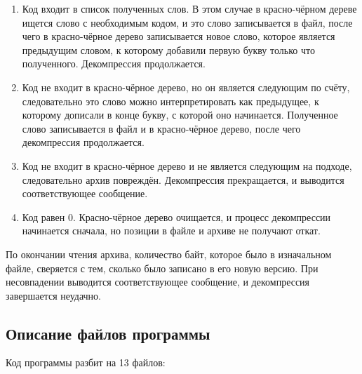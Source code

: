 \documentclass[12pt]{article}
\begin{document}
\begin{enumerate}
	\item Код входит в список полученных слов. В этом случае в красно-чёрном дереве ищется слово с необходимым кодом, и это слово записывается в файл, после чего в красно-чёрное дерево записывается новое слово, которое является предыдущим словом, к которому добавили первую букву только что полученного. Декомпрессия продолжается.
	\item Код не входит в красно-чёрное дерево, но он является следующим по счёту, следовательно это слово можно интерпретировать как предыдущее, к которому дописали в конце букву, с которой оно начинается. Полученное слово записывается в файл и в красно-чёрное дерево, после чего декомпрессия продолжается.
	\item Код не входит в красно-чёрное дерево и не является следующим на подходе, следовательно архив повреждён. Декомпрессия прекращается, и выводится соответствующее сообщение.
	\item Код равен $0$. Красно-чёрное дерево очищается, и процесс декомпрессии начинается сначала, но позиции в файле и архиве не получают откат.
\end{enumerate}

По окончании чтения архива, количество байт, которое было в изначальном файле, сверяется с тем, сколько было записано в его новую версию. При несовпадении выводится соответствующее сообщение, и декомпрессия завершается неудачно.


\subsection*{Описание файлов программы}

Код программы разбит на 13 файлов:
\end{document}

